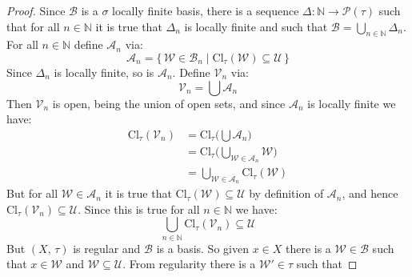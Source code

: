 \documentclass{article}
\theoremstyle{plain}
\theoremstyle{normal}
\begin{document}
        \begin{proof}
            Since $\mathcal{B}$ is a $\sigma$ locally finite basis, there is a
            sequence $\Delta:\mathbb{N}\rightarrow\mathcal{P}(\tau)$ such that
            for all $n\in\mathbb{N}$ it is true that $\Delta_{n}$ is locally
            finite and such that
            $\mathcal{B}=\bigcup_{n\in\mathbb{N}}\Delta_{n}$. For all
            $n\in\mathbb{N}$ define $\mathcal{A}_{n}$ via:
            \begin{equation}
                \mathcal{A}_{n}=
                \{\,\mathcal{W}\in\mathcal{B}_{n}\;|\;
                    \textrm{Cl}_{\tau}(\mathcal{W})\subseteq\mathcal{U}\,\}
            \end{equation}
            Since $\Delta_{n}$ is locally finite, so is $\mathcal{A}_{n}$.
            Define $\mathcal{V}_{n}$ via:
            \begin{equation}
                \mathcal{V}_{n}=\bigcup\mathcal{A}_{n}
            \end{equation}
            Then $\mathcal{V}_{n}$ is open, being the union of open sets, and
            since $\mathcal{A}_{n}$ is locally finite we have:
            \begin{align}
                \textrm{Cl}_{\tau}(\mathcal{V}_{n})
                &=\textrm{Cl}_{\tau}\Big(\bigcup\mathcal{A}_{n}\Big)\\
                &=\textrm{Cl}_{\tau}\Big(
                    \bigcup_{\mathcal{W}\in\mathcal{A}_{n}}\mathcal{W}\Big)\\
                &=\bigcup_{\mathcal{W}\in\mathcal{A}_{n}}
                    \textrm{Cl}_{\tau}(\mathcal{W})
            \end{align}
            But for all $\mathcal{W}\in\mathcal{A}_{n}$ it is true that
            $\textrm{Cl}_{\tau}(\mathcal{W})\subseteq\mathcal{U}$ by definition
            of $\mathcal{A}_{n}$, and hence
            $\textrm{Cl}_{\tau}(\mathcal{V}_{n})\subseteq\mathcal{U}$. Since
            this is true for all $n\in\mathbb{N}$ we have:
            \begin{equation}
                \bigcup_{n\in\mathbb{N}}
                    \textrm{Cl}_{\tau}(\mathcal{V}_{n})\subseteq\mathcal{U}
            \end{equation}
            But $(X,\,\tau)$ is regular and $\mathcal{B}$ is a basis. So given
            $x\in{X}$ there is a $\mathcal{W}\in\mathcal{B}$ such that
            $x\in\mathcal{W}$ and $\mathcal{W}\subseteq\mathcal{U}$. From
            regularity there is a $\mathcal{W}'\in\tau$ such that

\end{proof}
\end{document}
